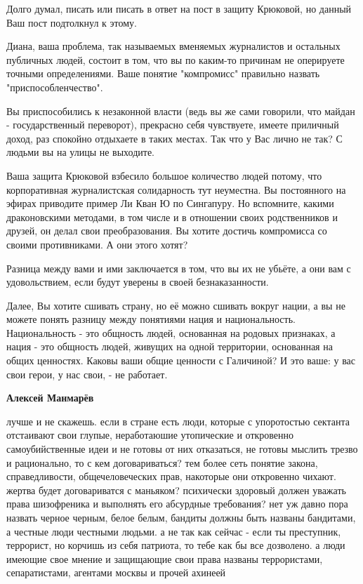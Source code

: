 \begin{itemize}
Долго думал, писать или писать в ответ на пост в защиту Крюковой, но данный Ваш
пост подтолкнул к этому. 

Диана, ваша проблема, так называемых вменяемых журналистов и остальных
публичных людей, состоит в том, что вы по каким-то причинам не оперируете
точными определениями. Ваше понятие "компромисс" правильно назвать
"приспособленчество". 

Вы приспособились к незаконной власти (ведь вы же сами говорили, что майдан -
государственный переворот), прекрасно себя чувствуете, имеете приличный доход,
раз спокойно отдыхаете в таких местах.  Так что у Вас лично не так? С людьми вы
на улицы не выходите. 

Ваша защита Крюковой взбесило большое количество людей потому, что
корпоративная журналистская солидарность тут неуместна. Вы постоянного на
эфирах приводите пример Ли Кван Ю по Сингапуру. Но вспомните, какими
драконовскими методами, в том числе и в отношении своих родственников и друзей,
он делал свои преобразования. Вы хотите достичь компромисса со своими
противниками. А они этого хотят? 

Разница между вами и ими заключается в том, что вы их не убьёте, а они вам с
удовольствием, если будут уверены в своей безнаказанности. 

Далее, Вы хотите сшивать страну, но её можно сшивать вокруг нации, а вы не
можете понять разницу между понятиями нация и национальность. Национальность -
это общность людей, основанная на родовых признаках, а нация - это общность
людей, живущих на одной территории, основанная на общих ценностях. Каковы ваши
общие ценности с Галичиной? И это ваше: у вас свои герои, у нас свои, - не
работает.

\begin{itemize}

 
\textbf{Алексей Манмарёв} 

лучше и не скажешь. если в стране есть люди, которые
с упоротостью сектанта отстаивают свои глупые, неработаюшие утопические и
откровенно самоубийственные идеи и не готовы от них отказаться, не готовы
мыслить трезво и рационально, то с кем договариваться? тем более сеть понятие
закона, справедливости, общечеловеческих прав, накоторые они откровенно чихают.
жертва будет договариватся с маньяком? психически здоровый должен уважать права
шизофреника и выполнять его абсурдные требования? нет уж давно пора назвать
черное черным, белое белым, бандиты должны быть названы бандитами, а честные
люди честными людьми. а не так как сейчас - если ты преступник, террорист, но
корчишь из себя патриота, то тебе как бы все дозволено. а люди имеющие свое
мнение и защищающие свои права названы террористами, сепаратистами, агентами
москвы и прочей ахинеей


\end{itemize}
\end{itemize}

